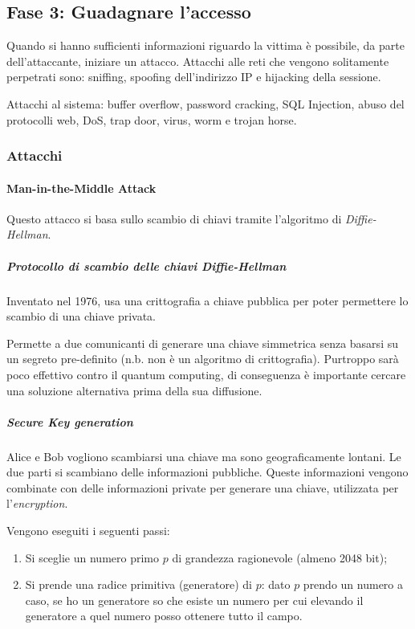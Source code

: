 \subsection{Fase 3: Guadagnare l'accesso}

Quando si hanno sufficienti informazioni riguardo la vittima è possibile, da
parte dell'attaccante, iniziare un attacco.
Attacchi alle reti che vengono solitamente perpetrati sono: sniffing, spoofing
dell'indirizzo IP e hijacking della sessione.

Attacchi al sistema: buffer overflow, password cracking, SQL Injection, abuso
del protocolli web, DoS, trap door, virus, worm e trojan horse.

\subsubsection{Attacchi}

\paragraph{Man-in-the-Middle Attack}

Questo attacco si basa sullo scambio di chiavi tramite l'algoritmo di
\textit{Diffie-Hellman}.

\subparagraph{Protocollo di scambio delle chiavi Diffie-Hellman}

Inventato nel 1976, usa una crittografia a chiave pubblica per poter
permettere lo scambio di una chiave privata.

Permette a due comunicanti di generare una chiave simmetrica senza basarsi su
un segreto pre-definito (n.b. non è un algoritmo di crittografia).
Purtroppo sarà poco effettivo contro il quantum computing, di conseguenza è
importante cercare una soluzione alternativa prima della sua diffusione.

\subparagraph{Secure Key generation}

Alice e Bob vogliono scambiarsi una chiave ma sono geograficamente lontani.
Le due parti si scambiano delle informazioni pubbliche. Queste informazioni
vengono combinate con delle informazioni private per generare una chiave,
utilizzata per l'\textit{encryption}.


Vengono eseguiti i seguenti passi:

\begin{enumerate}
 \item Si sceglie un numero primo $p$ di grandezza ragionevole (almeno 2048
 bit);
 \item Si prende una radice primitiva (generatore) di $p$: dato $p$ prendo un
 numero a caso, se ho un generatore so che esiste un numero per cui elevando il
 generatore a quel numero posso ottenere tutto il campo.
\end{enumerate}

